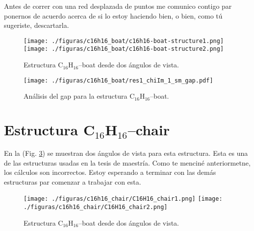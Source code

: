 \documentclass[11pt]{article}
\begin{document}
Antes de correr con una red desplazada de puntos me comunico contigo par ponernos de acuerdo acerca de si lo estoy haciendo bien, o bien, como t\'u sugeriste, descartarla.


\begin{figure}[h!]
	\begin{center}
		\texttt{[image: ./figuras/c16h16\_boat/c16h16-boat-structure1.png]}
		\texttt{[image: ./figuras/c16h16\_boat/c16h16-boat-structure2.png]}
	\end{center}
	\caption{Estructura C$_{16}$H$_{16}$--boat desde dos \'angulos de vista.}
	\label{fig:boat_struct}
\end{figure}


\begin{figure}[]
	\begin{center}
		\texttt{[image: ./figuras/c16h16\_boat/res1\_chiIm\_1\_sm\_gap.pdf]}
	\end{center}
	\caption{An\'alisis del gap para la estructura C$_{16}$H$_{16}$--boat.}
	\label{fig:boat_chi_im_gap}
\end{figure}

\newpage

\section{Estructura C$_{16}$H$_{16}$--chair}\label{section:chair}

En la (Fig. \ref{fig:chair_struct}) se muestran dos \'angulos de vista para esta estructura. Esta es una de las estructuras usadas en la tesis de maestr\'ia. Como te mencin\'e anteriormetne, los c\'alculos son incorrectos. Estoy esperando a terminar con las dem\'as estructuras par comenzar a trabajar con esta.

\begin{figure}[]
	\begin{center}
		\texttt{[image: ./figuras/c16h16\_chair/C16H16\_chair1.png]}
		\texttt{[image: ./figuras/c16h16\_chair/C16H16\_chair2.png]}
	\end{center}
	\caption{Estructura C$_{16}$H$_{16}$--boat desde dos \'angulos de vista.}
	\label{fig:chair_struct}
\end{figure}
\end{document}
